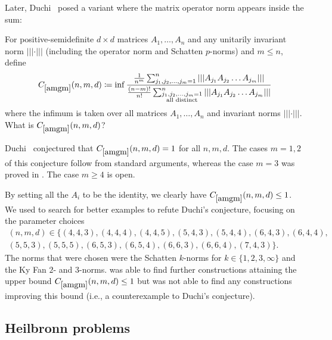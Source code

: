 Later, Duchi~\cite{ducci2012commentary} posed a variant  where the matrix operator norm appears inside the sum:

\renewcommand{\problemURL}{https://google-deepmind.github.io/alphaevolve_repository_of_problems/problems/47.html}

\begin{problem}\label{amgm}
For positive-semidefinite $d \times d$ matrices $A_1, \ldots, A_n$ and any unitarily invariant norm $|||\cdot|||$ (including the operator norm and Schatten $p$-norms) and $m \leq n$, define
\begin{align*}
C_{\ref{amgm}}(n,m,d) \coloneqq \inf \frac{
\frac{1}{n^m} \sum_{j_1, j_2, \ldots, j_m = 1}^{n} |||A_{j_1}A_{j_2}\ldots A_{j_m}|||}{ \frac{(n-m)!}{n!} \sum_{\substack{j_1, j_2, \ldots, j_m = 1 \\ \text{all distinct}}}^{n} |||A_{j_1}A_{j_2}\ldots A_{j_m}|||}
\end{align*}
where the infimum is taken over all matrices $A_1,\dots,A_n$ and invariant norms $|||\cdot|||$.  What is $C_{\ref{amgm}}(n,m,d)$?
\end{problem}

Duchi~\cite{ducci2012commentary} conjectured that $ C_{\ref{amgm}}(n,m,d)=1$ for all $n,m,d$.
The cases $m=1,2$ of this conjecture follow from standard arguments, whereas the case $m=3$ was proved in \cite{IKW-noncommutative}. The case $m \geq 4$ is open. 

By setting all the $A_i$ to be the identity, we clearly have $ C_{\ref{amgm}}(n,m,d) \leq 1$.
We used \AlphaEvolve to search for better examples to refute Duchi's conjecture, focusing on the parameter choices
\begin{align*}
    (n,m,d)\in \{(4,4,3), (4,4,4), (4,4,5), (5,4,3), (5,4,4), (6,4,3), (6,4,4), \\
(5,5,3), (5,5,5), (6,5,3), (6,5,4), (6,6,3), (6,6,4), (7,4,3)\}.
\end{align*}
The norms that were chosen were the Schatten $k$-norms for $k\in \{1, 2, 3, \infty\}$ and the Ky Fan $2$- and $3$-norms. \AlphaEvolve was able to find further constructions attaining the upper bound
$ C_{\ref{amgm}}(n,m,d) \leq 1$ but was not able to find any constructions improving this bound (i.e., a counterexample to Duchi's conjecture).

\subsection{Heilbronn problems}

